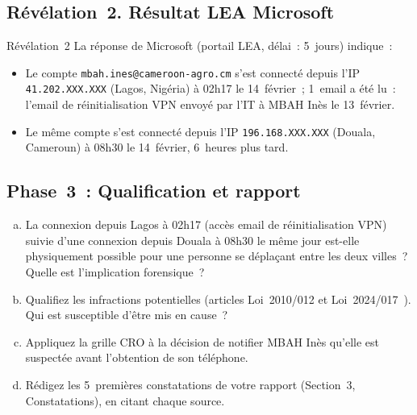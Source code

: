 \subsection{Révélation~2. Résultat LEA Microsoft}

\begin{boiteRemarque}{Révélation~2}
La réponse de Microsoft (portail LEA, délai~: 5~jours) indique~:
\begin{itemize}
    \item Le compte \texttt{mbah.ines@cameroon-agro.cm} s'est connecté
          depuis l'IP \texttt{41.202.XXX.XXX} (Lagos, Nigéria) à
          02h17 le 14~février~; 1~email a été lu~: l'email de réinitialisation
          VPN envoyé par l'IT à MBAH Inès le 13~février.
    \item Le même compte s'est connecté depuis l'IP
          \texttt{196.168.XXX.XXX} (Douala, Cameroun) à 08h30
          le 14~février, 6~heures plus tard.
\end{itemize}
\end{boiteRemarque}

\subsection{Phase~3~: Qualification et rapport}

\begin{boxexo}[title={\ding{45}\quad FAKO. Étape~3~: Qualification et rapport}]
\begin{enumerate}[(a)]
    \item La connexion depuis Lagos à 02h17 (accès email de réinitialisation
          VPN) suivie d'une connexion depuis Douala à 08h30 le même
          jour est-elle physiquement possible pour une personne
          se déplaçant entre les deux villes~? Quelle est l'implication
          forensique~?
    \item Qualifiez les infractions potentielles (articles Loi~2010/012
          et Loi~2024/017~\cite{cameroun2024donnees}). Qui est susceptible d'être mis en cause~?
    \item Appliquez la grille CRO à la décision de notifier MBAH Inès
          qu'elle est suspectée avant l'obtention de son téléphone.
    \item Rédigez les 5~premières constatations de votre rapport
          (Section~3, Constatations), en citant chaque source.
\end{enumerate}
\end{boxexo}

